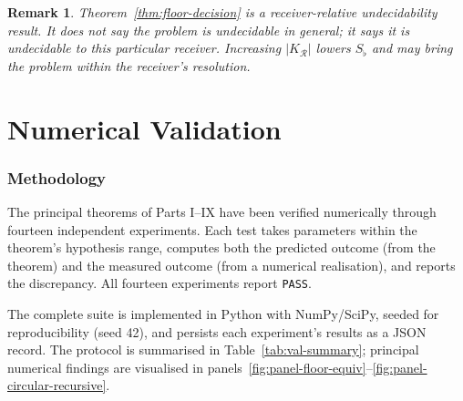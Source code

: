 \documentclass[twocolumn,a4paper]{article}
\newtheorem{remark}[theorem]{Remark}
\newcommand{\receiver}{\mathcal{R}}
\newcommand{\Sfloor}{S_{\flat}}
\begin{document}
\begin{remark}
Theorem~\ref{thm:floor-decision} is a receiver-relative undecidability result. It does not say the problem is undecidable in general; it says it is undecidable to this particular receiver. Increasing $|K_{\receiver}|$ lowers $\Sfloor$ and may bring the problem within the receiver's resolution.
\end{remark}

\part{Numerical Validation}

\section{Methodology}
\label{sec:val-methodology}

The principal theorems of Parts I--IX have been verified numerically through fourteen independent experiments. Each test takes parameters within the theorem's hypothesis range, computes both the predicted outcome (from the theorem) and the measured outcome (from a numerical realisation), and reports the discrepancy. All fourteen experiments report \texttt{PASS}.

The complete suite is implemented in Python with NumPy/SciPy, seeded for reproducibility (seed 42), and persists each experiment's results as a JSON record. The protocol is summarised in Table~\ref{tab:val-summary}; principal numerical findings are visualised in panels~\ref{fig:panel-floor-equiv}--\ref{fig:panel-circular-recursive}.
\end{document}
